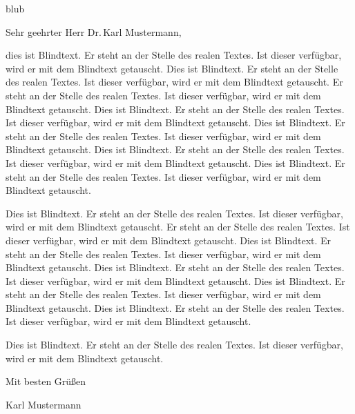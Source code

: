 \documentclass[ngerman,fontsize=10pt,enlargefirstpage=on,parskip=full]{scrlttr2}
\begin{document}
\begin{letter}{blub}

\makeatletter
{}
\makeatother
%




\opening{Sehr geehrter Herr Dr.\,Karl Mustermann,}
dies ist Blindtext. Er steht an der Stelle des realen Textes. Ist dieser verfügbar, wird er mit dem Blindtext getauscht. Dies ist Blindtext. Er steht an der Stelle des realen Textes. Ist dieser verfügbar, wird er mit dem Blindtext getauscht. Er steht an der Stelle des realen Textes. Ist dieser verfügbar, wird er mit dem Blindtext getauscht. Dies ist Blindtext. Er steht an der Stelle des realen Textes. Ist dieser verfügbar, wird er mit dem Blindtext getauscht. Dies ist Blindtext. Er steht an der Stelle des realen Textes. Ist dieser verfügbar, wird er mit dem Blindtext getauscht. Dies ist Blindtext. Er steht an der Stelle des realen Textes. Ist dieser verfügbar, wird er mit dem Blindtext getauscht. Dies ist Blindtext. Er steht an der Stelle des realen Textes. Ist dieser verfügbar, wird er mit dem Blindtext getauscht.

Dies ist Blindtext. Er steht an der Stelle des realen Textes. Ist dieser verfügbar, wird er mit dem Blindtext getauscht. Er steht an der Stelle des realen Textes. Ist dieser verfügbar, wird er mit dem Blindtext getauscht. Dies ist Blindtext. Er steht an der Stelle des realen Textes. Ist dieser verfügbar, wird er mit dem Blindtext getauscht. Dies ist Blindtext. Er steht an der Stelle des realen Textes. Ist dieser verfügbar, wird er mit dem Blindtext getauscht. Dies ist Blindtext. Er steht an der Stelle des realen Textes. Ist dieser verfügbar, wird er mit dem Blindtext getauscht. Dies ist Blindtext. Er steht an der Stelle des realen Textes. Ist dieser verfügbar, wird er mit dem Blindtext getauscht.

Dies ist Blindtext. Er steht an der Stelle des realen Textes. Ist dieser verfügbar, wird er mit dem Blindtext getauscht.


Mit besten Grüßen

Karl Mustermann


\end{letter}
\end{document}
